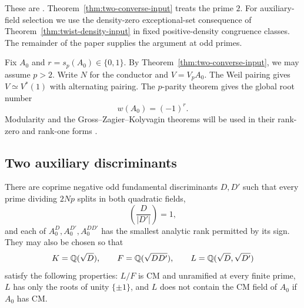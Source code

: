 These are \citet[Theorems~1.1 and~1.2]{OpenAIGoldfeldDensity2026}.
Theorem~\ref{thm:two-converse-input} treats the prime $2$.
For auxiliary-field selection we use the density-zero exceptional-set
consequence of Theorem~\ref{thm:twist-density-input} in fixed
positive-density congruence classes.
The remainder of the paper supplies the argument at odd primes.

Fix $A_0$ and $r=s_p(A_0)\in\{0,1\}$. By
Theorem~\ref{thm:two-converse-input}, we may assume $p>2$. Write
$N$ for the conductor and $V=V_pA_0$. The Weil pairing gives
$V\simeq V^*(1)$ with alternating pairing. The $p$-parity theorem
\citep[Theorem~1.4]{DokchitserDokchitser2010} gives the global root
number
\begin{equation}\label{eq:root-sign}
 w(A_0)=(-1)^r.
\end{equation}
Modularity and the Gross--Zagier--Kolyvagin theorems will be used in
their rank-zero and rank-one forms
\citep{BCDT2001,GrossZagier1986,Kolyvagin1990}.

\subsection{Two auxiliary discriminants}

\begin{lemma}\label{lem:auxiliary-fields}
There are coprime negative odd fundamental discriminants $D,D'$ such
that every prime dividing $2Np$ splits in both quadratic fields,
\[
 \left(\frac{D}{|D'|}\right)=1,
\]
and each of $A_0^D,A_0^{D'},A_0^{DD'}$ has the smallest analytic rank
permitted by its sign. They may also be chosen so that
\[
 K=\mathbb Q(\sqrt D),\qquad F=\mathbb Q(\sqrt{DD'}),\qquad
 L=\mathbb Q(\sqrt D,\sqrt{D'})
\]
satisfy the following properties: $L/F$ is CM and unramified at every
finite prime, $L$ has only the roots of unity $\{\pm1\}$, and $L$
does not contain the CM field of $A_0$ if $A_0$ has CM.
\end{lemma}

